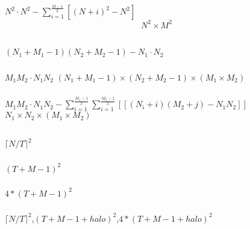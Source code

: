 \documentclass{article}
\begin{document}
\subsubsection{}
\sout{\(N^2\cdot N^2 - \sum_{i = 1}^{\frac{M-1}{2}}[(N+i)^2-N^2]\)} \[N^2 \times M^2\]

\subsection{}
\subsubsection{}
\((N_1+M_1-1)(N_2+M_2-1) - N_1\cdot N_2\)\

\subsubsection{}
\sout{\(M_1M_2\cdot N_1N_2\)} \((N_1 + M_1 - 1) \times (N_2 + M_2 - 1) \times (M_1 \times M_2)\)

\subsubsection{}
\sout{\(M_1M_2\cdot N_1N_2 - \sum_{i = 1}^{\frac{M_1-1}{2}}\sum_{i = 1}^{\frac{M_2-1}{2}}[[(N_i+i)(M_2+j)-N_1N_2]]\)} \(N_1 \times N_2 \times (M_1 \times M_2)\)

\subsection{}
\subsubsection{}
\(\lceil N/T\rceil ^2\)

\subsubsection{}
\((T+M-1)^2\)

\subsubsection{}
\(4*(T+M-1)^2\)

\subsubsection{}
\(\lceil N/T\rceil ^2\),\((T+M-1+halo)^2\),\(4*(T+M-1+halo)^2\)
\end{document}

